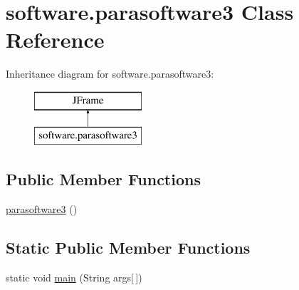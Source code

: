 \hypertarget{classsoftware_1_1parasoftware3}{}\section{software.\+parasoftware3 Class Reference}
\label{classsoftware_1_1parasoftware3}
Inheritance diagram for software.\+parasoftware3\+:\begin{figure}[H]
\begin{center}
\leavevmode
\includegraphics[height=2.000000cm]{classsoftware_1_1parasoftware3}
\end{center}
\end{figure}
\subsection*{Public Member Functions}
\begin{DoxyCompactItemize}
\item 
\mbox{\hyperlink{classsoftware_1_1parasoftware3_a385a29df3aa055a693bbb47225703547}{parasoftware3}} ()
\end{DoxyCompactItemize}
\subsection*{Static Public Member Functions}
\begin{DoxyCompactItemize}
\item 
static void \mbox{\hyperlink{classsoftware_1_1parasoftware3_a20a8c78671c3a423b115b4fd4e565ce1}{main}} (String args\mbox{[}$\,$\mbox{]})
\end{DoxyCompactItemize}
